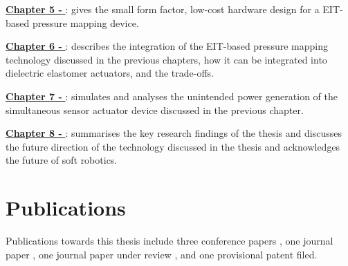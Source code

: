 \hyperref[chapter5]{\textbf{Chapter 5 - \chapvname}}: gives the small form factor, low-cost hardware design for a EIT-based pressure mapping device.

\hyperref[chapter6]{\textbf{Chapter 6 - \chapviname}}: describes the integration of the EIT-based pressure mapping technology discussed in the previous chapters, how it can be integrated into dielectric elastomer actuators, and the trade-offs.

\hyperref[chapter7]{\textbf{Chapter 7 - \chapviiname}}: simulates and analyses the unintended power generation of the simultaneous sensor actuator device discussed in the previous chapter.

\hyperref[chapter8]{\textbf{Chapter 8 - \chapviiiname}}: summarises the key research findings of the thesis and discusses the future direction of the technology discussed in the thesis and acknowledges the future of soft robotics.

\section{Publications}
Publications towards this thesis include three conference papers \cite{Ellingham2021,Ellingham2022,Ellingham2024a}, one journal paper \cite{Ellingham2024}, one journal paper under review \cite{}, and one provisional patent filed. 

\cleardoublepage